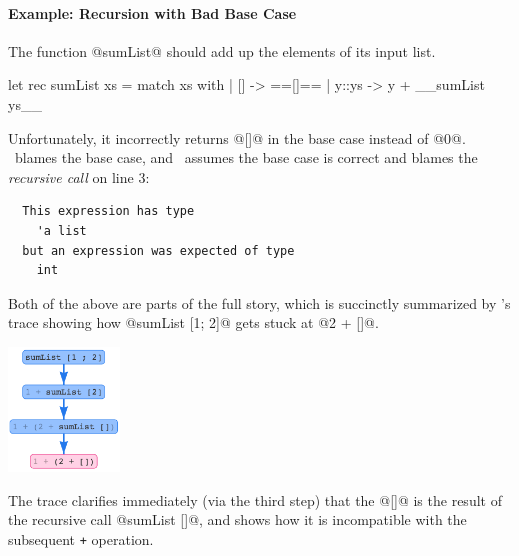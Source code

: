 \paragraph{Example: Recursion with Bad Base Case}
%
The function @sumList@ should add up
the elements of its input list.
%
\begin{ecode}
  let rec sumList xs = match xs with
    | []    -> ==[]==
    | y::ys -> y + __sumList ys__
\end{ecode}
%
Unfortunately, it incorrectly returns @[]@
in the base case instead of @0@.
%
\sherrloc\ blames the base case, and \ocaml\
assumes the base case is correct and blames
the \emph{recursive call} on line 3:
%
\begin{verbatim}
  This expression has type
    'a list
  but an expression was expected of type
    int
\end{verbatim}
%
Both of the above are parts of the full story, which
is succinctly summarized by \toolname's trace showing
how @sumList [1; 2]@ gets stuck at @2 + []@.
%
\begin{center}
  \includegraphics[height=125px]{sumlist.png}
\end{center}
%
The trace clarifies immediately (via the third step)
that the @[]@ is the result of the recursive call
@sumList []@, and shows how it is incompatible with
the subsequent \texttt{+} operation.


